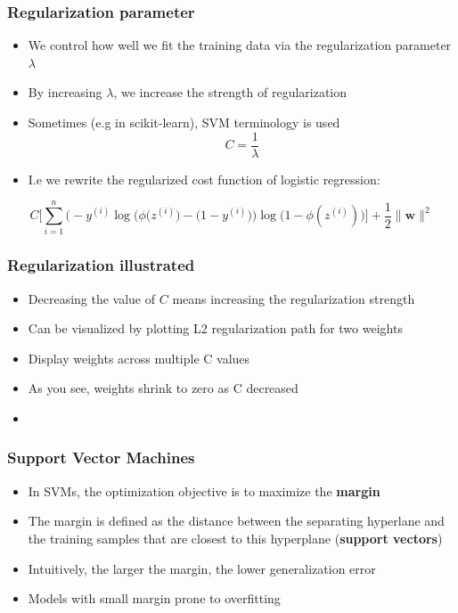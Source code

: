 \documentclass{beamer}
\begin{document}
\begin{frame}
  \frametitle{Regularization parameter}
  \begin{itemize}
  \item We control how well we fit the training data via the regularization parameter $\lambda$
  \item By increasing $\lambda$, we increase the strength of regularization
  \item Sometimes (e.g in scikit-learn), SVM terminology is used
    \[
    C = \frac{1}{\lambda}
    \]
  \item I.e we rewrite the regularized cost function of logistic regression:
  \end{itemize}
  \[
  C \Bigg[  \sum_{i=1}^{n} \Big(   -y^{(i)} \log \big( \phi(z^{(i)} \big) - \big(  1 - y^{(i)} \big)    \Big) \log \bigg( 1 - \phi(z^{(i)}) \bigg)         \Bigg] + \frac{1}{2} \lVert \mathbf{w} \rVert^2
  \]
\end{frame}

\begin{frame}
  \frametitle{Regularization illustrated}
  \begin{itemize}
  \item Decreasing the value of $C$ means increasing the regularization strength
  \item Can be visualized by plotting L2 regularization path for two weights
  \item Display weights across multiple C values
  \item As you see, weights shrink to zero as C decreased
  \item \href{https://github.com/rasbt/python-machine-learning-book/blob/master/code/ch03/ch03.ipynb}{}
  \end{itemize}
\end{frame}

\begin{frame}
  \frametitle{Support Vector Machines}
  \begin{itemize}
  \item In SVMs, the optimization objective is to maximize the \textbf{margin}
  \item The margin is defined as the distance between the separating hyperlane and the training samples that are closest to this hyperplane (\textbf{support vectors})
  \item Intuitively, the larger the margin, the lower generalization error
  \item Models with small margin prone to overfitting
  \end{itemize}
\end{frame}
\end{document}
